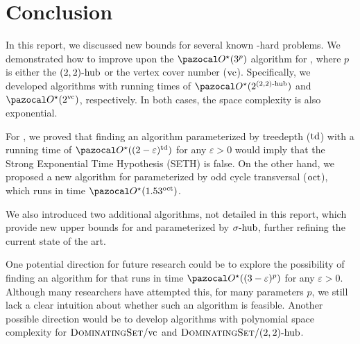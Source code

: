 \section{Conclusion}
\label{section:conclusion}

In this report, we discussed new bounds for several known \NP-hard problems. We demonstrated how to improve upon the $\O^\star(3^p)$ algorithm for , where $p$ is either the $\sdhub[2,2]$ or the vertex cover number ($\vc$). Specifically, we developed algorithms with running times of $\O^\star(2^{\sdhub[2,2]})$ and $\O^\star(2^\vc)$, respectively. In both cases, the space complexity is also exponential.

For , we proved that finding an algorithm parameterized by treedepth ($\td$) with a running time of $\O^\star((2 - \varepsilon)^\td)$ for any $\varepsilon > 0$ would imply that the Strong Exponential Time Hypothesis (SETH) is false. On the other hand, we proposed a new algorithm for  parameterized by odd cycle transversal ($\oct$), which runs in time $\O^\star(1.53^\oct)$.

\medskip

We also introduced two additional algorithms, not detailed in this report, which provide new upper bounds for  and  parameterized by $\shub$, further refining the current state of the art.

\medskip

One potential direction for future research could be to explore the possibility of finding an algorithm for  that runs in time $\O^\star((3-\varepsilon)^p)$ for any $\varepsilon > 0$. Although many researchers have attempted this, for many parameters $p$, we still lack a clear intuition about whether such an algorithm is feasible. Another possible direction would be to develop algorithms with polynomial space complexity for $\prob{DominatingSet}/\vc$ and $\prob{DominatingSet}/\sdhub[2,2]$.